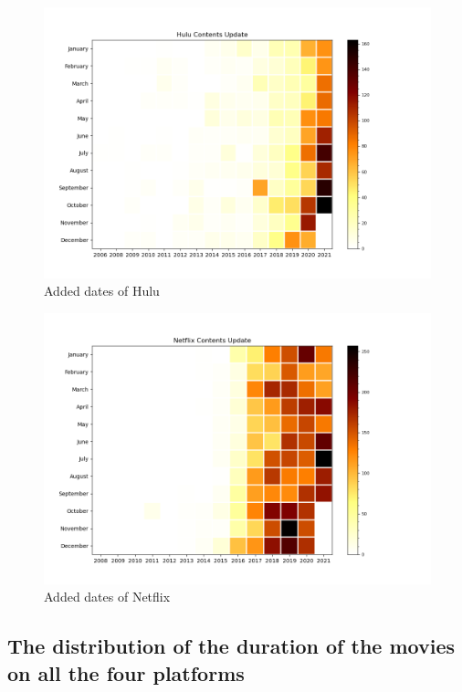 \documentclass{article}
\begin{document}
\begin{figure}[!htb]
	\centering
	\includegraphics[scale=0.3]{../contents_update/Hulu_contents_update.png}
	\caption{Added dates of Hulu}
	\label{fig:added_dates_hulu}
\end{figure}
\begin{figure}[!htb]
	\centering
	\includegraphics[scale=0.3]{../contents_update/Netflix_contents_update.png}
	\caption{Added dates of Netflix}
	\label{fig:added_dates_netflix}
\end{figure}

\subsection{The distribution of the duration of the movies on all the four platforms}
\label{parag:movie_duration_distribution}
\end{document}
